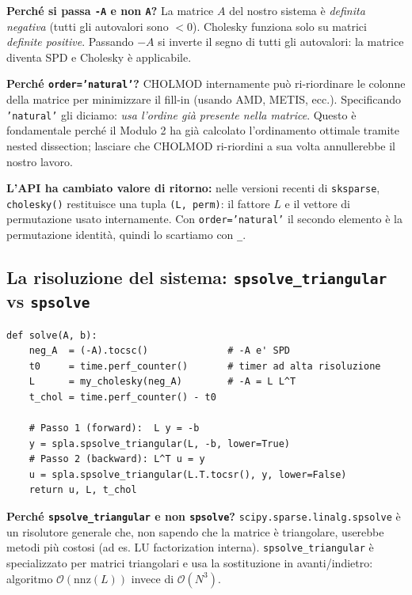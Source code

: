 \documentclass[a4paper,11pt]{article}
\theoremstyle{definition}
\begin{document}
\textbf{Perché si passa \texttt{-A} e non \texttt{A}?} La matrice $A$ del nostro sistema è \emph{definita negativa} (tutti gli autovalori sono $< 0$). Cholesky funziona solo su matrici \emph{definite positive}. Passando $-A$ si inverte il segno di tutti gli autovalori: la matrice diventa SPD e Cholesky è applicabile.

\textbf{Perché \texttt{order='natural'}?} CHOLMOD internamente può ri-riordinare le colonne della matrice per minimizzare il fill-in (usando AMD, METIS, ecc.). Specificando \texttt{'natural'} gli diciamo: \emph{usa l'ordine già presente nella matrice}. Questo è fondamentale perché il Modulo 2 ha già calcolato l'ordinamento ottimale tramite nested dissection; lasciare che CHOLMOD ri-riordini a sua volta annullerebbe il nostro lavoro.

\textbf{L'API ha cambiato valore di ritorno:} nelle versioni recenti di \texttt{sksparse}, \texttt{cholesky()} restituisce una tupla \texttt{(L, perm)}: il fattore $L$ e il vettore di permutazione usato internamente. Con \texttt{order='natural'} il secondo elemento è la permutazione identità, quindi lo scartiamo con \texttt{\_}.

\subsection{La risoluzione del sistema: \texttt{spsolve\_triangular} vs \texttt{spsolve}}

\begin{lstlisting}[style=python, caption={Forward e backward substitution esplicite}]
def solve(A, b):
    neg_A  = (-A).tocsc()              # -A e' SPD
    t0     = time.perf_counter()       # timer ad alta risoluzione
    L      = my_cholesky(neg_A)        # -A = L L^T
    t_chol = time.perf_counter() - t0

    # Passo 1 (forward):  L y = -b
    y = spla.spsolve_triangular(L, -b, lower=True)
    # Passo 2 (backward): L^T u = y
    u = spla.spsolve_triangular(L.T.tocsr(), y, lower=False)
    return u, L, t_chol
\end{lstlisting}

\textbf{Perché \texttt{spsolve\_triangular} e non \texttt{spsolve}?} \texttt{scipy.sparse.linalg.spsolve} è un risolutore generale che, non sapendo che la matrice è triangolare, userebbe metodi più costosi (ad es. LU factorization interna). \texttt{spsolve\_triangular} è specializzato per matrici triangolari e usa la sostituzione in avanti/indietro: algoritmo $\mathcal{O}(\text{nnz}(L))$ invece di $\mathcal{O}(N^3)$.
\end{document}
